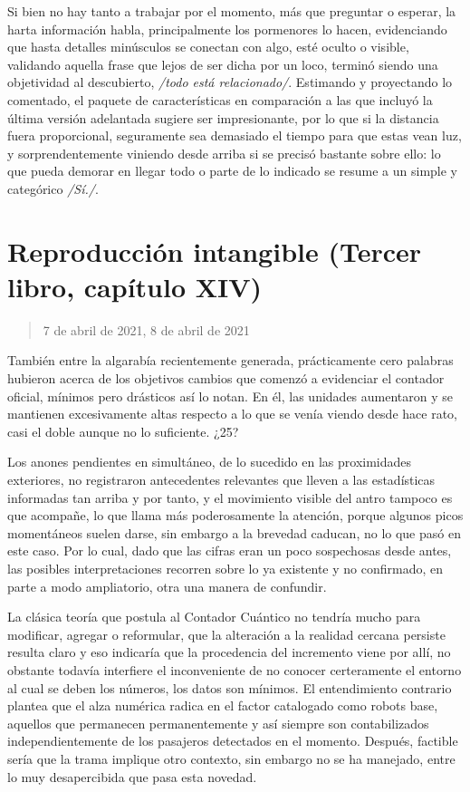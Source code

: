 \documentclass[
]{book}
\begin{document}
Si bien no hay tanto a trabajar por el momento, más que preguntar o esperar, la harta información habla, principalmente los pormenores lo hacen, evidenciando que hasta detalles minúsculos se conectan con algo, esté oculto o visible, validando aquella frase que lejos de ser dicha por un loco, terminó siendo una objetividad al descubierto, \emph{/todo está relacionado/}. Estimando y proyectando lo comentado, el paquete de características en comparación a las que incluyó la última versión adelantada sugiere ser impresionante, por lo que si la distancia fuera proporcional, seguramente sea demasiado el tiempo para que estas vean luz, y sorprendentemente viniendo desde arriba si se precisó bastante sobre ello: lo que pueda demorar en llegar todo o parte de lo indicado se resume a un simple y categórico \emph{/Sí./}.

\hypertarget{reproducciuxf3n-intangible-tercer-libro-capuxedtulo-xiv}{%
\section{Reproducción intangible (Tercer libro, capítulo XIV)}\label{reproducciuxf3n-intangible-tercer-libro-capuxedtulo-xiv}}

\begin{quote}
7 de abril de 2021, 8 de abril de 2021
\end{quote}

También entre la algarabía recientemente generada, prácticamente cero palabras hubieron acerca de los objetivos cambios que comenzó a evidenciar el contador oficial, mínimos pero drásticos así lo notan. En él, las unidades aumentaron y se mantienen excesivamente altas respecto a lo que se venía viendo desde hace rato, casi el doble aunque no lo suficiente. ¿25?

Los anones pendientes en simultáneo, de lo sucedido en las proximidades exteriores, no registraron antecedentes relevantes que lleven a las estadísticas informadas tan arriba y por tanto, y el movimiento visible del antro tampoco es que acompañe, lo que llama más poderosamente la atención, porque algunos picos momentáneos suelen darse, sin embargo a la brevedad caducan, no lo que pasó en este caso. Por lo cual, dado que las cifras eran un poco sospechosas desde antes, las posibles interpretaciones recorren sobre lo ya existente y no confirmado, en parte a modo ampliatorio, otra una manera de confundir.

La clásica teoría que postula al Contador Cuántico no tendría mucho para modificar, agregar o reformular, que la alteración a la realidad cercana persiste resulta claro y eso indicaría que la procedencia del incremento viene por allí, no obstante todavía interfiere el inconveniente de no conocer certeramente el entorno al cual se deben los números, los datos son mínimos. El entendimiento contrario plantea que el alza numérica radica en el factor catalogado como robots base, aquellos que permanecen permanentemente y así siempre son contabilizados independientemente de los pasajeros detectados en el momento. Después, factible sería que la trama implique otro contexto, sin embargo no se ha manejado, entre lo muy desapercibida que pasa esta novedad.
\end{document}
